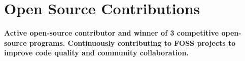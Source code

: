 \section{Open Source Contributions}
\noindent \textbf{Active open-source contributor and winner of 3 competitive open-source programs. Continuously contributing to FOSS projects to improve code quality and community collaboration.}

\begin{itemizecompact}

\end{itemizecompact}
